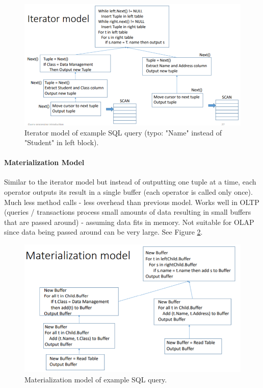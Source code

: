 \begin{figure}[h]
	\centering
	\includegraphics[scale=0.7]{images/3-iterator.PNG}
	\caption{Iterator model of example SQL query (typo: "Name" instead of "Student" in left block).}
	\label{fig:iterator}
\end{figure}

\paragraph{Materialization Model}
Similar to the iterator model but instead of outputting one tuple at a time, each operator outputs its result in a single buffer (each operator is called only once). Much less method calls - less overhead than previous model. Works well in OLTP (queries / transactions process small amounts of data resulting in small buffers that are passed around) - assuming data fits in memory. Not suitable for OLAP since data being passed around can be very large. See Figure \ref{fig:material}.

\begin{figure}[h]
	\centering
	\includegraphics[scale=0.7]{images/3-material.PNG}
	\caption{Materialization model of example SQL query.}
	\label{fig:material}
\end{figure}

